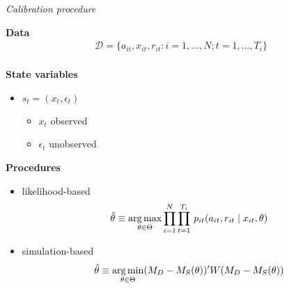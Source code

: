 \begin{frame}\begin{center}
		\LARGE\textit{Calibration procedure}
\end{center}\end{frame}
\begin{frame}

\textbf{Data}\vspace{0.3cm}
\begin{align*}
	\mathcal{D} = \{a_{it}, x_{it}, r_{it}: i = 1, \hdots, N; t = 1, \hdots, T_i\}\\
\end{align*}

\textbf{State variables}\vspace{0.3cm}
\begin{itemize}\setlength\itemsep{1em}
\item $s_t = (x_t, \epsilon_t)$\medskip
\begin{itemize}\setlength\itemsep{1em}
	\item $x_t$ observed
	\item $\epsilon_t$ unobserved
\end{itemize}
\end{itemize}
\end{frame}
\begin{frame}
\textbf{Procedures}\vspace{0.5cm}
\begin{itemize}\setlength\itemsep{1em}
\item likelihood-based
\begin{align*}
  \hat{\theta} \equiv \operatorname*{arg\,max}_{\theta \in \Theta} \prod^N_{i= 1} \prod^{T_i}_{t= 1}\, p_{it}(a_{it}, r_{it} \mid x_{it}, \theta)
\end{align*}
\item simulation-based
\begin{align*}
    \hat{\theta} \equiv \operatorname*{arg\,min}_{\theta \in \Theta} (M_D - M_S(\theta))' W (M_D - M_S(\theta))
\end{align*}
\end{itemize}
\end{frame}
